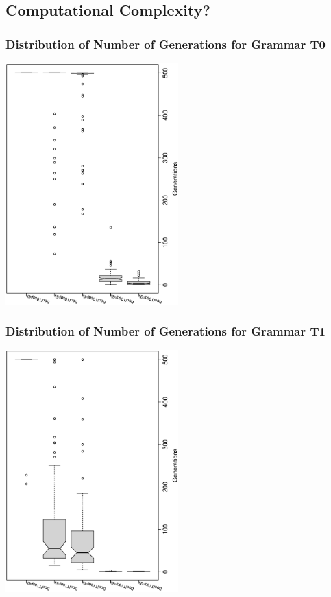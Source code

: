 \documentclass[18pt,c]{beamer}
\begin{document}
\subsection{Computational Complexity?}
 \begin{frame}
 \frametitle{ Distribution of Number of Generations for Grammar T0 }
 \begin{center}
\includegraphics[width=0.5\textwidth, angle=-90]
{ExpBboxplottGenerations005.eps}
 \end{center}
 \label{ExpBboxplottGenerations005.eps}  
 \end{frame}

 \begin{frame}
 \frametitle{ Distribution of Number of Generations for Grammar T1 }
 \begin{center}
\includegraphics[width=0.5\textwidth, angle=-90]
{ExpBboxplottGenerations006.eps}
 \end{center}
 \label{ExpBboxplottGenerations006.eps}  
 \end{frame}
\end{document}
